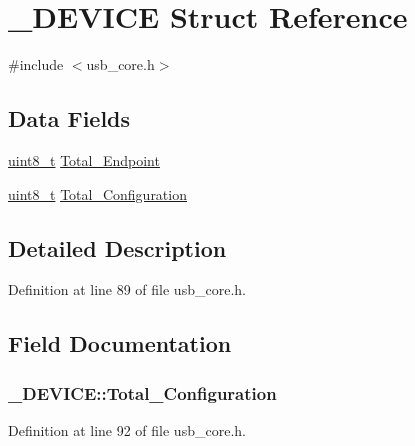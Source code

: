 \hypertarget{struct___d_e_v_i_c_e}{\section{\-\_\-\-D\-E\-V\-I\-C\-E Struct Reference}
\label{struct___d_e_v_i_c_e}
}


{\ttfamily \#include $<$usb\-\_\-core.\-h$>$}

\subsection*{Data Fields}
\begin{DoxyCompactItemize}
\item 
\hyperlink{stdint_8h_aba7bc1797add20fe3efdf37ced1182c5}{uint8\-\_\-t} \hyperlink{struct___d_e_v_i_c_e_a71a35c7d6066f9512effe87efab7e99a}{Total\-\_\-\-Endpoint}
\item 
\hyperlink{stdint_8h_aba7bc1797add20fe3efdf37ced1182c5}{uint8\-\_\-t} \hyperlink{struct___d_e_v_i_c_e_af4604eda06f26a15fa6aa6fa88f31b63}{Total\-\_\-\-Configuration}
\end{DoxyCompactItemize}


\subsection{Detailed Description}


Definition at line 89 of file usb\-\_\-core.\-h.



\subsection{Field Documentation}
\hypertarget{struct___d_e_v_i_c_e_af4604eda06f26a15fa6aa6fa88f31b63}{
\subsubsection[{Total\-\_\-\-Configuration}]{ \-\_\-\-D\-E\-V\-I\-C\-E\-::\-Total\-\_\-\-Configuration}}\label{struct___d_e_v_i_c_e_af4604eda06f26a15fa6aa6fa88f31b63}


Definition at line 92 of file usb\-\_\-core.\-h.

